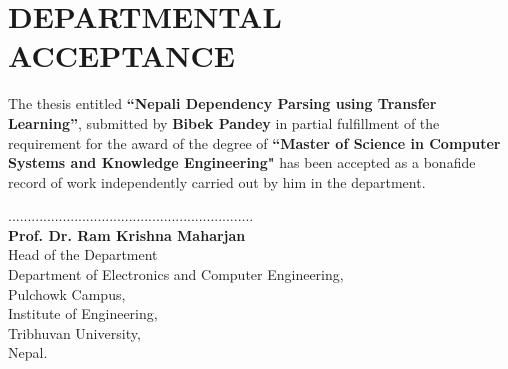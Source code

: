 \chapter*{DEPARTMENTAL ACCEPTANCE}
The thesis entitled \textbf{``Nepali Dependency Parsing using Transfer Learning''}, submitted by \textbf{Bibek Pandey} in partial fulfillment of the requirement for the award of the degree of \textbf{``Master of Science in Computer Systems and Knowledge Engineering"} has been accepted as a bonafide record of work independently carried out by him in the department.\par
\vspace{5cm}
...............................................................\\
\textbf{Prof. Dr. Ram Krishna Maharjan} \\
Head of the Department \\
Department of Electronics and Computer Engineering, \\
Pulchowk Campus, \\
Institute of Engineering, \\
Tribhuvan University, \\
Nepal.
\newpage
